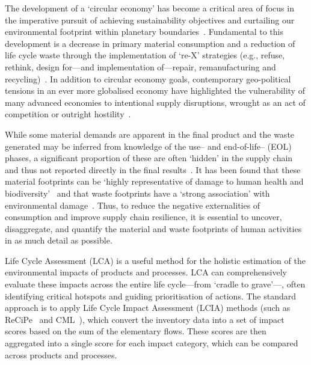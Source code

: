 The development of a `circular economy' has become a critical area of focus in the imperative pursuit of achieving sustainability objectives and curtailing our environmental footprint within planetary boundaries~\citep{eu2019greendeal, eu2020circ,nl2023ceplan,nl2016ceplan,pardo2018ce,ellenmacarthur2015ce}. Fundamental to this development is a decrease in primary material consumption and a reduction of life cycle waste through the implementation of `re-X' strategies (e.g., refuse, rethink, design for---and implementation of---repair, remanufacturing and recycling)~\citep{eu2022ecodesign, eu2022repair,eu2015reman}. In addition to circular economy goals, contemporary geo-political tensions in an ever more globalised economy have highlighted the vulnerability of many advanced economies to intentional supply disruptions, wrought as an act of competition or outright hostility~\citep{jrc2023supplychain,hartley2024cepolitics,berry2023crm}.

While some material demands are apparent in the final product and the waste generated may be inferred from knowledge of the use-- and end-of-life-- (EOL) phases, a significant proportion of these are often `hidden' in the supply chain and thus not reported directly in the final results~\citep{laurenti2016wastefootprint,salviulo2021supplychain}. It has been found that these material footprints can be `highly representative of damage to human health and biodiversity'~\citep{steinmann2017resourcefootprints} and that waste footprints have a `strong association' with environmental damage~\citep{laurenti2023wastefootprint}. Thus, to reduce the negative externalities of consumption and improve supply chain resilience, it is essential to uncover, disaggregate, and quantify the material and waste footprints of human activities in as much detail as possible.


Life Cycle Assessment (LCA) is a useful method for the holistic estimation of the environmental impacts of products and processes. LCA can comprehensively evaluate these impacts across the entire life cycle---from `cradle to grave'---, often identifying critical hotspots and guiding prioritisation of actions. The standard approach is to apply Life Cycle Impact Assessment (LCIA) methods (such as ReCiPe~\citep{huijbregts2016recipe} and CML~\citep{guinee2002cml}), which convert the inventory data into a set of impact scores based on the sum of the elementary flows. These scores are then aggregated into a single score for each impact category, which can be compared across products and processes.

